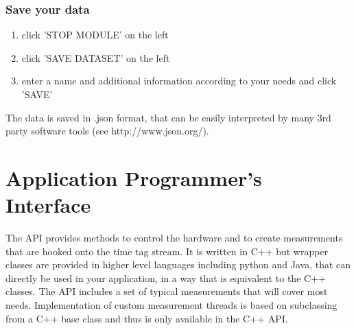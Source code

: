 \documentclass[oneside]{memoir}
\begin{document}
\subsection{Save your data}

\begin{enumerate}
 \item click 'STOP MODULE' on the left
 \item click 'SAVE DATASET' on the left
 \item enter a name and additional information according to your needs and click 'SAVE'
\end{enumerate}
The data is saved in .json format, that can be easily interpreted by many 3rd party software
tools (see http://www.json.org/).

% 
% 
% 
% 
% 
% 
% 

\chapter{Application Programmer's Interface}\label{sec:API}

The API provides methods to control the hardware and to create
measurements that are hooked onto the time tag stream. It is written in C++ but
wrapper classes are provided in higher level languages including python and
Java, that can directly be used in your application, in a way that is equivalent
to the C++ classes. The API includes a set of typical measurements that will
cover most needs. Implementation of custom measurement threads is based on
subclassing from a C++ base class and thus is only available in the C++ API.
\end{document}
